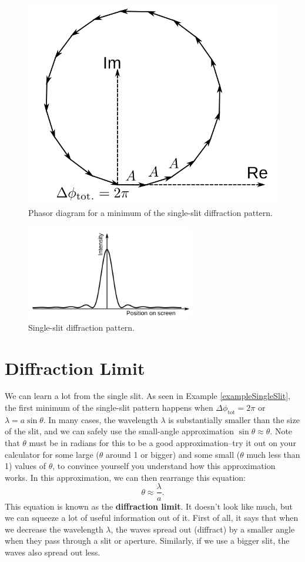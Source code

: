 \begin{figure}[t]
\begin{center}\includegraphics[width=2.in]{phasors/manySlitPhasorsMin}
\end{center}
\caption{\label{manySlitPhasorsMinFig}Phasor diagram for a minimum of the
single-slit diffraction pattern.}
\end{figure}

\begin{figure}[b]
\begin{center}\includegraphics[width=2.9in]{phasors/singleSlitPattern}
\end{center}
\caption{\label{singleSlitFig}Single-slit diffraction pattern.}
\end{figure}





\section{Diffraction Limit}
\label{sec:diffraction_limit}

We can learn a lot from the single slit. As seen in Example \ref{exampleSingleSlit},
the first minimum of the single-slit pattern happens when
$\Delta\phi_\text{tot}= 2\pi$ or
$\lambda = a\sin\theta$.  In many cases, the wavelength $\lambda$ is substantially
smaller than the size of the slit, and we can safely use the small-angle approximation
$\sin\theta\approx\theta$.  Note that $\theta$ must be in radians for this to 
be a good approximation--try it out on your calculator for some large ($\theta$
around 1 or bigger) and some small ($\theta$ much less than 1) values of $\theta$,
to convince yourself you understand how this approximation works.
In this approximation, we can then rearrange this equation:
\begin{equation}
\theta \approx \frac{\lambda}{a}
.\end{equation}
This equation is known as the \textbf{diffraction limit}.
It   doesn't look  like much,  but we can  squeeze a  lot of
useful information out of it.  First of all, it says that when we decrease 
the wavelength $\lambda$, the waves spread out (diffract) by a smaller angle 
when they pass through a  slit or aperture. Similarly, if we use a bigger slit, 
the waves also spread out less. 

